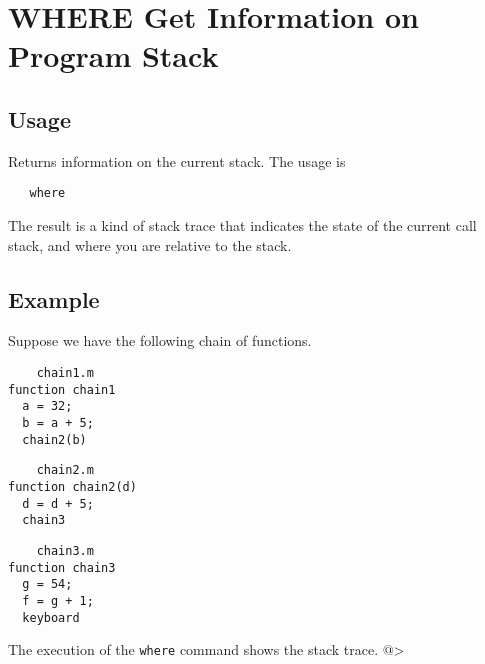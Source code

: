 \section{WHERE Get Information on Program Stack}

\subsection{Usage}

Returns information on the current stack.  The usage is
\begin{verbatim}
   where
\end{verbatim}
The result is a kind of stack trace that indicates the state
of the current call stack, and where you are relative to the
stack.
\subsection{Example}

Suppose we have the following chain of functions.
\begin{verbatim}
    chain1.m
function chain1
  a = 32;
  b = a + 5;
  chain2(b)
\end{verbatim}
\begin{verbatim}
    chain2.m
function chain2(d)
  d = d + 5;
  chain3
\end{verbatim}
\begin{verbatim}
    chain3.m
function chain3
  g = 54;
  f = g + 1;
  keyboard
\end{verbatim}
The execution of the \verb|where| command shows the stack trace.
@>
